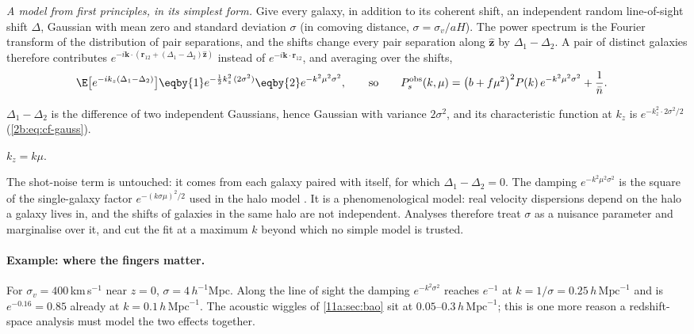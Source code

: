 \emph{A model from first principles, in its simplest form.} Give every galaxy, in
addition to its coherent shift, an independent random line-of-sight shift
$\Delta$, Gaussian with mean zero and standard deviation $\sigma$ (in comoving
distance, $\sigma=\sigma_v/aH$). The power spectrum is the Fourier transform of
the distribution of pair separations, and the shifts change every pair
separation along $\hat{\bm z}$ by $\Delta_1-\Delta_2$. A pair of distinct galaxies
therefore contributes $e^{-i\bm k\cdot(\bm r_{12}+(\Delta_1-\Delta_2)\hat{\bm z})}$
instead of $e^{-i\bm k\cdot\bm r_{12}}$, and averaging over the shifts,
\begin{align}
  \E\bigl[e^{-ik_z(\Delta_1-\Delta_2)}\bigr]
  &\eqby{1}e^{-\frac12k_z^2\,(2\sigma^2)}
   \eqby{2}e^{-k^2\mu^2\sigma^2},
  \qquad\text{so}\qquad
  P_s^{\mathrm{obs}}(k,\mu)=\bigl(b+f\mu^2\bigr)^2P(k)\,e^{-k^2\mu^2\sigma^2}+\frac1{\bar n}.
  \label{11a:eq:fog}
\end{align}
\begin{explain}
  \item $\Delta_1-\Delta_2$ is the difference of two independent Gaussians,
        hence Gaussian with variance $2\sigma^2$, and its characteristic function
        at $k_z$ is $e^{-k_z^2\cdot2\sigma^2/2}$ (\eqref{2b:eq:cf-gauss}).
  \item $k_z=k\mu$.
\end{explain}
The shot-noise term is untouched: it comes from each galaxy paired with itself,
for which $\Delta_1-\Delta_2=0$. The damping $e^{-k^2\mu^2\sigma^2}$ is the square of
the single-galaxy factor $e^{-(k\sigma\mu)^2/2}$ used in the halo model
. It is a phenomenological model:
real velocity dispersions depend on the halo a galaxy lives in, and the shifts of
galaxies in the same halo are not independent. Analyses therefore treat $\sigma$
as a nuisance parameter and marginalise over it, and cut the fit at a maximum
$k$ beyond which no simple model is trusted.

\paragraph{Example: where the fingers matter.}
For $\sigma_v=400$\,km\,s$^{-1}$ near $z=0$, $\sigma=4\,h^{-1}$Mpc. Along the line of
sight the damping $e^{-k^2\sigma^2}$ reaches $e^{-1}$ at
$k=1/\sigma=0.25\,h\,\mathrm{Mpc}^{-1}$ and is $e^{-0.16}=0.85$ already at
$k=0.1\,h\,\mathrm{Mpc}^{-1}$. The acoustic wiggles of \cref{11a:sec:bao} sit at
$0.05$--$0.3\,h\,\mathrm{Mpc}^{-1}$; this is one more reason a redshift-space
analysis must model the two effects together.

